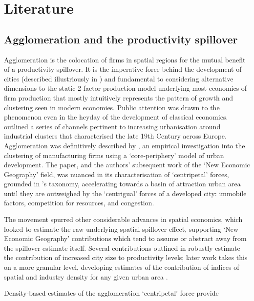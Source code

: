 \section{Literature}
\label{s:literature}

\subsection{Agglomeration and the productivity spillover}
\label{ss:lit-agglom}

Agglomeration is the colocation of firms in spatial regions
for the mutual benefit of a productivity spillover.
It is the imperative force behind the development of cities
(described illustriously in \cite{Goldin2023})
and fundamental to considering alternative dimensions
to the static 2-factor production model underlying most
economics of firm production that mostly intuitively
represents the pattern of growth and clustering
seen in modern economies.
Public attention was drawn to the phenomenon even in the heyday
of the development of classical economics. \cite{Marshall1920}
outlined a series of channels pertinent to increasing urbanisation
around industrial clusters that characterised the late 19th Century across Europe.
Agglomeration was definitively described by \cite{Krugman1991},
an empirical investigation into the clustering of manufacturing firms
using a `core-periphery' model of urban development.
The paper, and the authors' subsequent work of the `New Economic Geography'
field\cite{Krugman1998, Fujita2004, Koo2007}, was nuanced in its characterisation of
`centripetal' forces, grounded in \cite{Marshall1920}'s taxonomy,
accelerating towards a basin of attraction urban area
until they are outweighed by the `centrigual' forces of a developed city:
immobile factors, competition for resources, and congestion.
\par
The movement spurred other considerable advances in spatial economics,
which looked to estimate the raw underlying spatial spillover effect,
supporting `New Economic Geography' contributions which tend to assume
or abstract away from the spillover estimate itself.
Several contributions outlined in \cite{Beeson1991} robustly estimate
the contribution of increased city size to productivity levels;
later work takes this on a more granular level,
developing estimates of the contribution of indices of
spatial and industry density for any given urban area \cite{Glaeser1992,Ellison2010}.
\par
Density-based estimates of the agglomeration `centripetal' force provide
